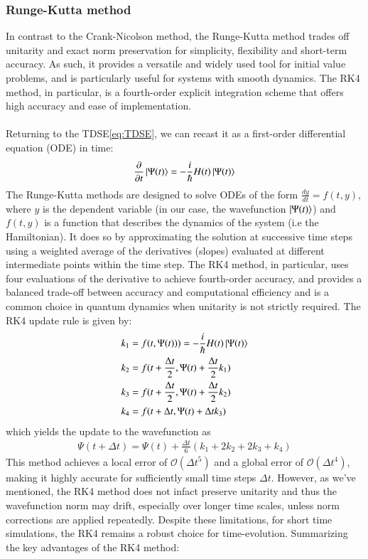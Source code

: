 \documentclass{subfiles}
\begin{document}
\subsubsection{Runge-Kutta method}
In contrast to the Crank-Nicolson method, the Runge-Kutta method trades off unitarity and exact norm preservation for simplicity, flexibility and short-term accuracy. As such, it provides a versatile and widely used tool for initial value problems, and is particularly useful for systems with smooth dynamics. The RK4 method, in particular, is a fourth-order explicit integration scheme that offers high accuracy and ease of implementation.
\\\\
Returning to the TDSE\eqref{eq:TDSE}, we can recast it as a first-order differential equation (ODE) in time:
\begin{align*}
    \frac{\partial}{\partial t}\ket{\Psi(t)} = -\frac{i}{\hbar}H(t)\ket{\Psi(t)}
\end{align*}
The Runge-Kutta methods are designed to solve ODEs of the form $\frac{dy}{dt} = f(t, y)$, where $y$ is the dependent variable (in our case, the wavefunction $\ket{\Psi(t)}$) and $f(t, y)$ is a function that describes the dynamics of the system (i.e the Hamiltonian). It does so by approximating the solution at successive time steps using a weighted average of the derivatives (slopes) evaluated at different intermediate points within the time step. The RK4 method, in particular, uses four evaluations of the derivative to achieve fourth-order accuracy, and provides a balanced trade-off between accuracy and computational efficiency and is a common choice in quantum dynamics when unitarity is not strictly required. The RK4 update rule is given by:
\begin{align*}
    k_1 &= f(t, \Psi(t))) = -\frac{i}{\hbar}H(t)\ket{\Psi(t)} \\
    k_2 &= f(t + \frac{\Delta t}{2}, \Psi(t) + \frac{\Delta t}{2}k_1) \\
    k_3 &= f(t + \frac{\Delta t}{2}, \Psi(t) + \frac{\Delta t}{2}k_2) \\
    k_4 &= f(t + \Delta t, \Psi(t) + \Delta t k_3)
\end{align*}
which yields the update to the wavefunction as
\begin{align*}
    \Psi(t + \Delta t) = \Psi(t) + \frac{\Delta t}{6}(k_1 + 2k_2 + 2k_3 + k_4)
\end{align*}
This method achieves a local error of $\mathcal{O}(\Delta t^5)$ and a global error of $\mathcal{O}(\Delta t^4)$, making it highly accurate for sufficiently small time steps $\Delta t$. However, as we've mentioned, the RK4 method does not infact preserve unitarity and thus the wavefunction norm may drift, especially over longer time scales, unless norm corrections are applied repeatedly. Despite these limitations, for short time simulations, the RK4 remains a robust choice for time-evolution. Summarizing the key advantages of the RK4 method:
\end{document}
